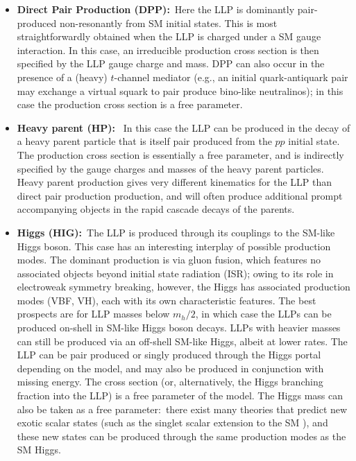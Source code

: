 %
\begin{itemize}

\item {\bf Direct Pair Production (DPP):}~Here the LLP is dominantly pair-produced non-resonantly from SM initial states.  This is most straightforwardly obtained when the LLP is charged under a SM gauge interaction.  
In this case, an irreducible production cross section is then specified by the LLP gauge charge and mass.  DPP can also occur in the presence of a (heavy) $t$-channel mediator (e.g., an initial quark-antiquark pair may exchange a virtual squark to pair produce bino-like neutralinos); in this case the production cross section is a free parameter.

\item {\bf Heavy parent (HP):}~ In this case the LLP can be produced in the decay of a heavy parent particle that is itself pair produced from the $pp$ initial state. The production cross section is essentially a free parameter, and is indirectly specified by the gauge charges and masses of the heavy parent particles. Heavy parent production gives very different kinematics for the LLP than direct pair production production, and will often produce additional prompt accompanying objects in the rapid cascade decays of the parents.

\item {\bf Higgs (HIG):}~The LLP is produced through its couplings to the SM-like Higgs boson.  This case has an interesting interplay of possible production modes. The dominant production  is via  gluon fusion, which features no associated objects beyond initial state radiation (ISR); owing to its role in electroweak symmetry breaking, however, the Higgs has associated production modes (VBF, VH), each with its own characteristic features. The best prospects are for LLP masses below $m_h/2$, in which case the LLPs can be produced on-shell in SM-like Higgs boson decays. LLPs with heavier masses can still be produced via an off-shell SM-like Higgs, albeit at lower rates. The LLP can be pair produced or singly produced through the Higgs portal depending on the model, and may also be produced in conjunction with missing energy. The cross section (or, alternatively, the Higgs branching fraction into the LLP) is a free parameter of the model. The Higgs mass can also be taken as a free parameter:~there exist many theories that predict new exotic scalar states (such as the singlet scalar extension to the SM \cite{Silveira:1985rk}), and these new states can be produced through the same production modes as the SM Higgs.



\end{itemize}
